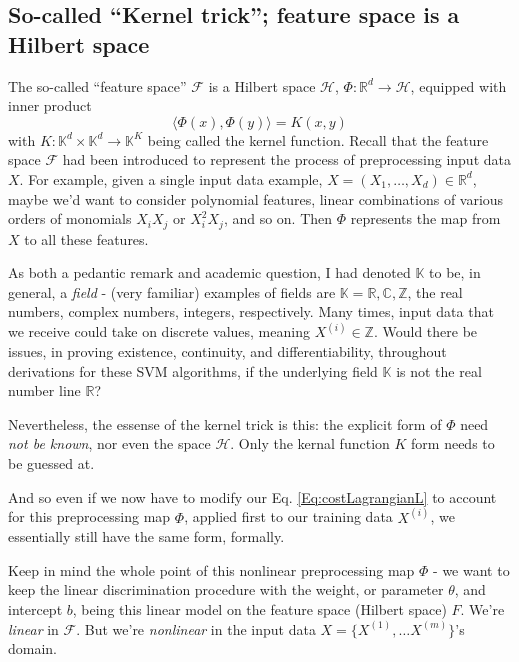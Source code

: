 \documentclass[10pt]{amsart}
\begin{document}
\begin{multicols*}{2}
\subsection{So-called ``Kernel trick''; feature space is a Hilbert space}\label{SubSec:Kerneltrick}

The so-called ``feature space'' $\mathcal{F}$ is a Hilbert space $\mathcal{H}$, $\Phi:\mathbb{R}^d \to \mathcal{H}$, equipped with inner product
\begin{equation}
\langle \Phi(x), \Phi(y) \rangle = K(x,y)
  \end{equation}
with $K: \mathbb{K}^d\times \mathbb{K}^d \to \mathbb{K}^K$ being called the kernel function.  Recall that the feature space $\mathcal{F}$ had been introduced to represent the process of preprocessing input data $X$.  For example, given a single input data example, $X=(X_1,\dots, X_d)\in \mathbb{R}^d$, maybe we'd want to consider polynomial features, linear combinations of various orders of monomials $X_iX_j$ or $X_i^2 X_j$, and so on.  Then $\Phi$ represents the map from $X$ to all these features.

As both a pedantic remark and academic question, I had denoted $\mathbb{K}$ to be, in general, a \emph{field} - (very familiar) examples of fields are $\mathbb{K}=\mathbb{R}, \mathbb{C}, \mathbb{Z}$, the real numbers, complex numbers, integers, respectively.  Many times, input data that we receive could take on discrete values, meaning $X^{(i)} \in \mathbb{Z}$.  Would there be issues, in proving existence, continuity, and differentiability, throughout derivations for these SVM algorithms, if the underlying field $\mathbb{K}$ is not the real number line $\mathbb{R}$?

Nevertheless, the essense of the kernel trick is this: the explicit form of $\Phi$ need \emph{not be known}, nor even the space $\mathcal{H}$.  Only the kernal function $K$ form needs to be guessed at.  

And so even if we now have to modify our Eq. \ref{Eq:costLagrangianL} to account for this preprocessing map $\Phi$, applied first to our training data $X^{(i)}$, we essentially still have the same form, formally.

Keep in mind the whole point of this nonlinear preprocessing map $\Phi$ - we want to keep the linear discrimination procedure with the weight, or parameter $\theta$, and intercept $b$, being this linear model on the feature space (Hilbert space) $F$.  We're \emph{linear} in $\mathcal{F}$.  But we're \emph{nonlinear} in the input data $X=\lbrace X^{(1)},\dots X^{(m)}\rbrace$'s domain.


\end{multicols*}
\end{document}
